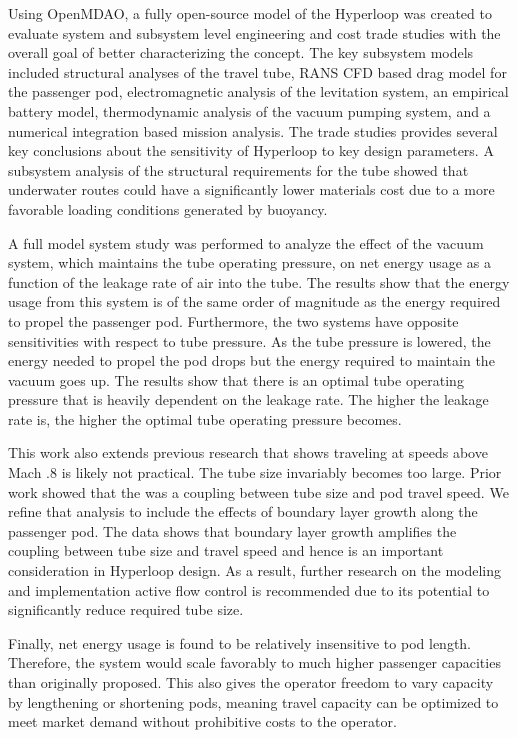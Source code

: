Using OpenMDAO, a fully open-source model of the Hyperloop was created to
evaluate system and subsystem level engineering and cost trade studies with
the overall goal of better characterizing the concept. The key subsystem
models included structural analyses of the travel tube, RANS CFD based drag
model for the passenger pod, electromagnetic analysis of the levitation
system, an empirical battery model, thermodynamic analysis of the vacuum
pumping system, and a numerical integration based mission analysis. The trade
studies provides several key conclusions about the sensitivity of Hyperloop to
key design parameters. A subsystem analysis of the structural requirements
for the tube showed that underwater routes could have a significantly lower
materials cost due to a more favorable loading conditions generated by
buoyancy.

A full model system study was performed to analyze the effect of the vacuum
system, which maintains the tube operating pressure, on net energy usage as a
function of the leakage rate of air into the tube. The results show that the
energy usage from this system is of the same order of magnitude as the energy
required to propel the passenger pod. Furthermore, the two systems have
opposite sensitivities with respect to tube pressure. As the tube pressure is
lowered, the energy needed to propel the pod drops but the energy required to
maintain the vacuum goes up. The results show that there is
an optimal tube operating pressure that is heavily dependent on the leakage
rate. The higher the leakage rate is, the higher the optimal tube operating
pressure becomes.

This work also extends previous research that shows traveling at speeds above
Mach .8 is likely not practical. The tube size invariably becomes too large.
Prior work showed that the was a coupling between tube size and pod travel
speed. We refine that analysis to include the effects of boundary layer growth
along the passenger pod. The data shows that boundary layer growth amplifies
the coupling between tube size and travel speed and hence is an important
consideration in Hyperloop design. As a result, further research on the
modeling and implementation active flow control is recommended due to its
potential to significantly reduce required tube size.

Finally, net energy usage is found to be relatively insensitive to pod length.
Therefore, the system would scale favorably to much higher passenger
capacities than originally proposed.
This also gives the operator freedom to vary capacity by lengthening or
shortening pods, meaning travel capacity can be optimized to meet market demand
without prohibitive costs to the operator.

